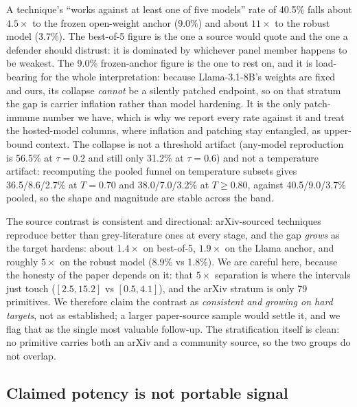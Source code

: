 \documentclass[letterpaper,twocolumn,10pt]{article}
\begin{document}
A technique's ``works against at least one of five models'' rate of 40.5\% falls about $4.5\times$ to the frozen open-weight anchor (9.0\%) and about $11\times$ to the robust model (3.7\%). The best-of-5 figure is the one a source would quote and the one a defender should distrust: it is dominated by whichever panel member happens to be weakest. The 9.0\% frozen-anchor figure is the one to rest on, and it is load-bearing for the whole interpretation: because Llama-3.1-8B's weights are fixed and ours, its collapse \emph{cannot} be a silently patched endpoint, so on that stratum the gap is carrier inflation rather than model hardening. It is the only patch-immune number we have, which is why we report every rate against it and treat the hosted-model columns, where inflation and patching stay entangled, as upper-bound context. The collapse is not a threshold artifact (any-model reproduction is 56.5\% at $\tau{=}0.2$ and still only 31.2\% at $\tau{=}0.6$) and not a temperature artifact: recomputing the pooled funnel on temperature subsets gives 36.5/8.6/2.7\% at $T{=}0.70$ and 38.0/7.0/3.2\% at $T{\geq}0.80$, against 40.5/9.0/3.7\% pooled, so the shape and magnitude are stable across the band.

The source contrast is consistent and directional: arXiv-sourced techniques reproduce better than grey-literature ones at every stage, and the gap \emph{grows} as the target hardens: about $1.4\times$ on best-of-5, $1.9\times$ on the Llama anchor, and roughly $5\times$ on the robust model (8.9\% vs 1.8\%). We are careful here, because the honesty of the paper depends on it: that $5\times$ separation is where the intervals just touch ($[2.5, 15.2]$ vs $[0.5, 4.1]$), and the arXiv stratum is only 79 primitives. We therefore claim the contrast as \emph{consistent and growing on hard targets}, not as established; a larger paper-source sample would settle it, and we flag that as the single most valuable follow-up. The stratification itself is clean: no primitive carries both an arXiv and a community source, so the two groups do not overlap.

\subsection{Claimed potency is not portable signal}
\label{sec:c2}
\end{document}
